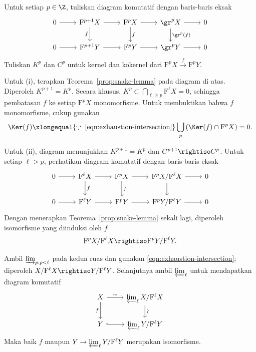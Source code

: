 \begin{bukti}
	Untuk setiap $p\in\Z$, tuliskan diagram komutatif dengan baris-baris eksak
	\[\begin{tikzcd}
		0 \arrow[r] & \mathrm{F}^{p+1} X \arrow[d, "f"'] \arrow[r] & \mathrm{F}^p X \arrow[r] \arrow[d, "f"] & \gr^p X \arrow[r] \arrow[d, "{\gr^p(f)}"] & 0 \\
		0 \arrow[r] & \mathrm{F}^{p+1} Y \arrow[r] & \mathrm{F}^p Y \arrow[r] & \gr^p Y \arrow[r] & 0
	\end{tikzcd}\]
	Tuliskan $K^p$ dan $C^p$ untuk kernel dan kokernel dari
	$\mathrm{F}^pX\xrightarrow{f}\mathrm{F}^pY$.

	Untuk (i), terapkan Teorema~\ref{prop:snake-lemma} pada diagram di atas.
	Diperoleh $K^{p+1}=K^p$. Secara khusus,
	$K^p\subset\bigcap_{\ell\geq p}\mathrm{F}^\ell X=0$, sehingga pembatasan
	$f$ ke setiap $\mathrm{F}^pX$ monomorfisme. Untuk membuktikan bahwa $f$
	monomorfisme, cukup gunakan
	\[ \Ker(f) \xlongequal{\because\; \text{\eqref{eqn:exhaustion-intersection}}} \bigcup_p \left( \Ker(f) \cap \mathrm{F}^p X \right) = 0. \]

	Untuk (ii), diagram menunjukkan $K^{p+1}=K^p$ dan
	$C^{p+1}\rightiso C^p$. Untuk setiap $\ell>p$, perhatikan diagram komutatif
dengan baris-baris eksak
	\[\begin{tikzcd}
		0 \arrow[r] & \mathrm{F}^{\ell} X \arrow[r] \arrow[d, "f"] & \mathrm{F}^p X \arrow[r] \arrow[d, "f"] & \mathrm{F}^p X / \mathrm{F}^{\ell} X \arrow[r] \arrow[d] & 0 \\
		0 \arrow[r] & \mathrm{F}^{\ell} Y \arrow[r] & \mathrm{F}^p Y \arrow[r] & \mathrm{F}^p Y / \mathrm{F}^{\ell} Y \arrow[r] & 0
	\end{tikzcd}\]
	Dengan menerapkan Teorema~\ref{prop:snake-lemma} sekali lagi, diperoleh
	isomorfisme yang diinduksi oleh $f$
	\[ \mathrm{F}^p X / \mathrm{F}^\ell X \rightiso \mathrm{F}^p Y / \mathrm{F}^\ell Y. \]

	Ambil $\varinjlim_{p:p<\ell}$ pada kedua ruas dan gunakan
	\eqref{eqn:exhaustion-intersection}; diperoleh
	$X/\mathrm{F}^\ell X\rightiso Y/\mathrm{F}^\ell Y$. Selanjutnya ambil
	$\varprojlim_\ell$ untuk mendapatkan diagram komutatif
	\[\begin{tikzcd}
		X \arrow[r, "\sim"] \arrow[d, "f"'] & \varprojlim_\ell X/\mathrm{F}^\ell X \arrow[d, "\sim" sloped] \\
		Y \arrow[hookrightarrow, r] & \varprojlim_\ell Y/\mathrm{F}^\ell Y
	\end{tikzcd}\]
	Maka baik $f$ maupun $Y\to\varprojlim_\ell Y/\mathrm{F}^\ell Y$
	merupakan isomorfisme.
\end{bukti}
